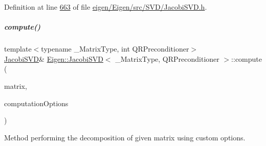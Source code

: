 Definition at line \hyperlink{eigen_2_eigen_2src_2_s_v_d_2_jacobi_s_v_d_8h_source_l00663}{663} of file \hyperlink{eigen_2_eigen_2src_2_s_v_d_2_jacobi_s_v_d_8h_source}{eigen/\+Eigen/src/\+S\+V\+D/\+Jacobi\+S\+V\+D.\+h}.

\mbox{\label{group___s_v_d___module_a0446cd26490736510bc7be243b882060}} 
\subparagraph{\texorpdfstring{compute()}{compute()}\hspace{0.1cm}{\footnotesize\ttfamily [2/4]}}
{\footnotesize\ttfamily template$<$typename \+\_\+\+Matrix\+Type, int Q\+R\+Preconditioner$>$ \\
\hyperlink{group___s_v_d___module_class_eigen_1_1_jacobi_s_v_d}{Jacobi\+S\+VD}\& \hyperlink{group___s_v_d___module_class_eigen_1_1_jacobi_s_v_d}{Eigen\+::\+Jacobi\+S\+VD}$<$ \+\_\+\+Matrix\+Type, Q\+R\+Preconditioner $>$\+::compute (\begin{DoxyParamCaption}\item[{const Matrix\+Type \&}]{matrix,  }\item[{unsigned int}]{computation\+Options }\end{DoxyParamCaption})}



Method performing the decomposition of given matrix using custom options. 


